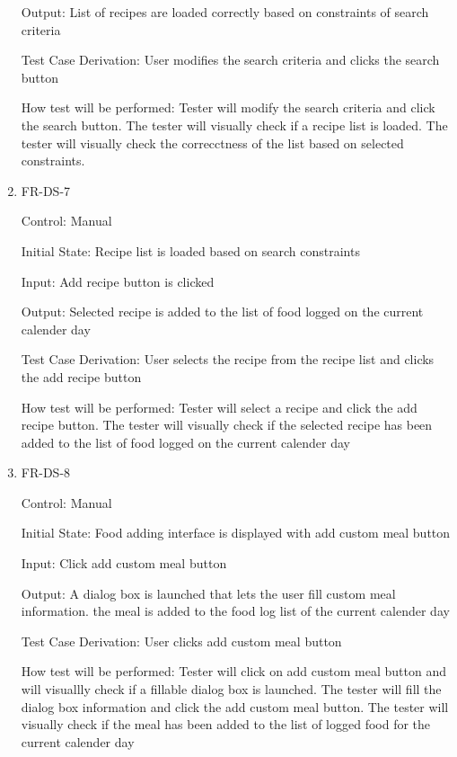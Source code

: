 \documentclass[12pt, titlepage]{article}
\begin{document}
\begin{enumerate}
	Output: List of recipes are loaded correctly based on constraints of search criteria
	
	Test Case Derivation: User modifies the search criteria and clicks the search button
	
	How test will be performed: Tester will modify the search criteria and click the search button. The tester will visually check if a recipe list is loaded. The tester will visually check the correcctness of the list based on selected constraints.
	
	\item{FR-DS-7\\}
	
	Control: Manual
	
	Initial State: Recipe list is loaded based on search constraints
	
	Input: Add recipe button is clicked
	
	Output: Selected recipe is added to the list of food logged on the current calender day
	
	Test Case Derivation: User selects the recipe from the recipe list and clicks the add recipe button
	
	How test will be performed: Tester will select a recipe and click the add recipe button. The tester will visually check if the selected recipe has been added to the list of food logged on the current calender day
	
	\item{FR-DS-8 \\}
	
	Control: Manual
	
	Initial State: Food adding interface is displayed with add custom meal button
	
	Input: Click add custom meal button
	
	Output: A dialog box is launched that lets the user fill custom meal information. the meal is added to the food log list of the current calender day
	
	Test Case Derivation: User clicks add custom meal button
	
	How test will be performed: Tester will click on add custom meal button and will visuallly check if a fillable dialog box is launched. The tester will fill the dialog box information and click the add custom meal button. The tester will visually check if the meal has been added to the list of logged food for the current calender day
	
\end{enumerate}
\end{document}

